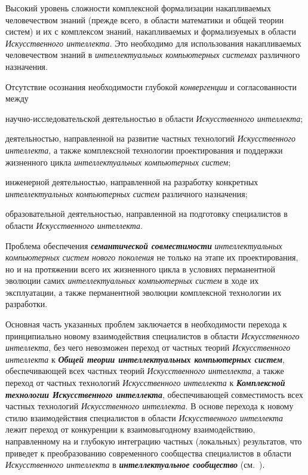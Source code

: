 \begin{textitemize}
	\medskip
	\item 
	Высокий уровень сложности комплексной формализации  накапливаемых человечеством знаний (прежде всего, в области математики и общей теории систем) и их  с комплексом знаний, накапливаемых и формализуемых в области \textit{Искусственного интеллекта}. Это необходимо для  использования накапливаемых человечеством знаний в \textit{интеллектуальных компьютерных системах} различного назначения.
	\medskip
	\item 
	Отсутствие осознания необходимости глубокой \textit{конвергенции} и согласованности между
	\begin{textitemize}
		\item научно-исследовательской деятельностью в области \textit{Искусственного интеллекта};
		\item деятельностью, направленной на развитие частных технологий \textit{Искусственного интеллекта}, а также комплексной технологии проектирования и поддержки жизненного цикла \textit{интеллектуальных компьютерных систем};
		\item инженерной деятельностью, направленной на разработку конкретных \textit{интеллектуальных компьютерных систем} различного назначения;
		\item образовательной деятельностью, направленной на подготовку специалистов в области \textit{Искусственного интеллекта}.
	\end{textitemize}
	\item 
	Проблема обеспечения \textbf{\textit{семантической совместимости}} \textit{интеллектуальных компьютерных систем нового поколения} не только на этапе их проектирования, но и на протяжении всего их жизненного цикла в условиях перманентной эволюции самих \textit{интеллектуальных компьютерных систем} в ходе их эксплуатации, а также перманентной эволюции комплексной технологии их разработки.
\end{textitemize}

Основная часть указанных проблем заключается в необходимости перехода к принципиально новому   взаимодействия специалистов в области \textit{Искусственного интеллекта}, без чего невозможен переход от частных теорий \textit{Искусственного интеллекта} к \textbf{\textit{Общей теории интеллектуальных компьютерных систем}}, обеспечивающей  всех частных теорий \textit{Искусственного интеллекта}, а также переход от частных технологий \textit{Искусственного интеллекта} к \textbf{\textit{Комплексной технологии Искусственного интеллекта}}, обеспечивающей совместимость всех частных технологий \textit{Искусственного интеллекта}. В основе перехода к новому стилю взаимодействия специалистов в области \textit{Искусственного интеллекта} лежит переход от конкуренции к  взаимовыгодному взаимодействию, направленному на  и глубокую интеграцию частных (локальных) результатов, что приведет к преобразованию современного сообщества специалистов в области \textit{Искусственного интеллекта} в \textbf{\textit{интеллектуальное сообщество}} (см.~\textit{}).

